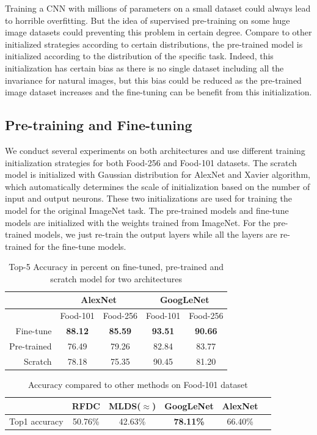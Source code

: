 ﻿Training a CNN with millions of parameters on a small dataset could always lead to horrible overfitting. But the idea of supervised pre-training on some huge image datasets could preventing this problem in certain degree. Compare to other initialized strategies according to certain distributions, the pre-trained model is initialized according to the distribution of the specific task. Indeed, this initialization has certain bias as there is no single dataset including all the invariance for natural images\cite{agrawal2014analyzing}, but this bias could be reduced as the pre-trained image dataset increases and the fine-tuning can be benefit from this initialization.
\subsection{Pre-training and Fine-tuning}
We conduct several experiments on both architectures and use different training initialization strategies for both Food-256 and Food-101 datasets. The scratch model is initialized with Gaussian distribution for AlexNet and Xavier algorithm\cite{glorot2010understanding}, which automatically determines the scale of initialization based on the number of input and output neurons. These two initializations are used for training the model for the original ImageNet task. The pre-trained models and fine-tune models are initialized with the weights trained from ImageNet. For the pre-trained models, we just re-train the output layers while all the layers are re-trained for the fine-tune models.
\begin{table}[htbp]
  \centering
  \caption{Top-5 Accuracy in percent on fine-tuned, pre-trained and scratch model for two architectures}
    \begin{tabular}{r|cc|cc}
    \toprule
          & \multicolumn{2}{c|}{AlexNet} & \multicolumn{2}{c}{GoogLeNet} \\    \midrule
     & Food-101   & Food-256   & Food-101   & Food-256 \\
    Fine-tune & \textbf{88.12} & \textbf{85.59} & \textbf{93.51} & \textbf{90.66} \\
    Pre-trained &76.49	&79.26&	82.84	&83.77\\
    Scratch & 78.18 & 75.35 & 90.45 & 81.20 \\
    \bottomrule
    \end{tabular}%
  \label{tab:ft}%
\end{table}%

\begin{table}[htbp]
  \centering
  \caption{Accuracy compared to other methods on Food-101 dataset}
    \begin{tabular}{c|ccccc}
    \toprule
          & RFDC\cite{bossard14} & MLDS($\approx$\cite{singh2012unsupervised}) & GoogLeNet & AlexNet \\
    \midrule
    Top1 accuracy & 50.76\% & 42.63\%& \textbf{78.11\% }& 66.40\% \\
    \bottomrule
    \end{tabular}%
\end{table}%



